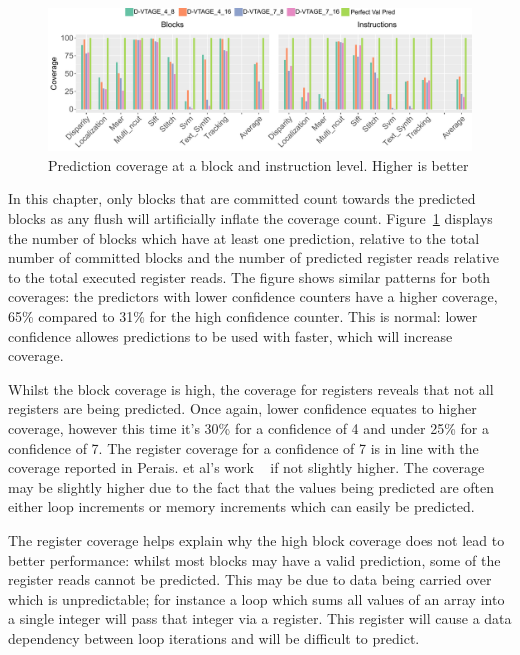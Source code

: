 \begin{figure}[t]
    \centering
    \includegraphics[width=1\textwidth]{chapter3/graphics/coverageFull.pdf}
    \caption{Prediction coverage at a block and instruction level. Higher is better}
    \label{fig:vtag_cov_block}
	\vspace{1em}
\end{figure}

In this chapter, only blocks that are committed count towards the predicted blocks as any flush will artificially inflate the coverage count.
Figure~\ref{fig:vtag_cov_block} displays the number of blocks which have at least one prediction, relative to the total number of committed blocks and the number of predicted register reads relative to the total executed register reads.
The figure shows similar patterns for both coverages: the predictors with lower confidence counters have a higher coverage, 65\% compared to 31\% for the high confidence counter.
This is normal: lower confidence allowes predictions to be used with faster, which will increase coverage.

Whilst the block coverage is high, the coverage for registers reveals that not all registers are being predicted.
Once again, lower confidence equates to higher coverage, however this time it's 30\% for a confidence of 4 and under 25\% for a confidence of 7.
The register coverage for a confidence of 7 is in line with the coverage reported in Perais. et al's work ~\cite{peraisBeBop2015, peraisVTAGE2014} if not slightly higher.
The coverage may be slightly higher due to the fact that the values being predicted are often either loop increments or memory increments which can easily be predicted.

The register coverage helps explain why the high block coverage does not lead to better performance: whilst most blocks may have a valid prediction, some of the register reads cannot be predicted.
This may be due to data being carried over which is unpredictable; for instance a loop which sums all values of an array into a single integer will pass that integer via a register.
This register will cause a data dependency between loop iterations and will be difficult to predict.

